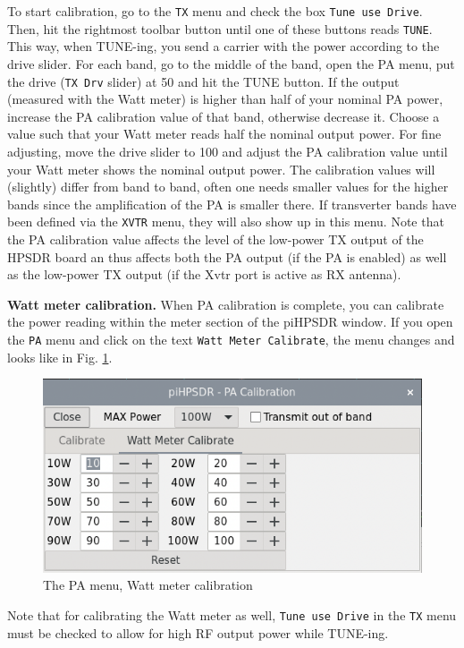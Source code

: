 \documentclass[12pt]{book}
\def\rett#1{\texttt{\color{red}#1}}
\def\bltt#1{\texttt{\color{blue}#1}}
\def\pH{pi\-HPSDR\xspace}
\begin{document}
To start calibration, go to the \bltt{TX} menu and check the
box \rett{Tune use Drive}. Then, hit the rightmost toolbar button
until one of these buttons reads \bltt{TUNE}. This way, when
TUNE-ing, you send a carrier with the power according to the drive
slider. For each band, go to the middle of the band, open the PA
menu, put the drive (\rett{TX Drv} slider) at 50 and hit the TUNE button. If the
output (measured with the Watt meter) is higher than half
of your nominal PA power, increase the
PA calibration value of that band, otherwise decrease it. Choose
a value such that your Watt meter reads half the nominal output
power. For fine adjusting, move the drive slider to 100 and
adjust the PA calibration value until your Watt meter shows the
nominal output  power. The calibration values will  (slightly)
differ from band to band, often one needs smaller values for the
higher bands since the amplification of the PA is smaller there.
If transverter bands have been defined via the \bltt{XVTR} menu,
they will also show up in this menu. Note that the PA calibration
value affects the level of the low-power TX output of the HPSDR board
an thus affects both the PA output (if the PA is enabled) as well
as the low-power TX output (if the Xvtr port is active as RX antenna).

\textbf{Watt meter calibration.} When PA calibration is complete,
you can calibrate the power reading within the meter section of
the \pH window. If you open the \bltt{PA} menu and click
on the text \rett{Watt Meter Calibrate}, the menu changes
and looks like in Fig. \ref{fig:PAMenuWatt}.

\begin{figure}[ht]
\center
\includegraphics[scale=0.45]{PAmenuWatt.png}
\caption{The PA menu, Watt meter calibration}
\label{fig:PAMenuWatt}
\end{figure}
Note that for calibrating the Watt meter as well,
\rett{Tune use Drive} in the \bltt{TX} menu must be checked
to allow for high RF output
power while TUNE-ing.
\end{document}
